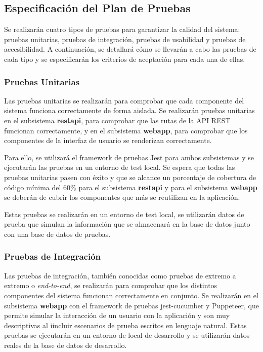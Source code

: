 \subsection{Especificación del Plan de Pruebas}
Se realizarán cuatro tipos de pruebas para garantizar la calidad del sistema: pruebas unitarias, pruebas de integración, pruebas de usabilidad y pruebas de accesibilidad.
A continuación, se detallará cómo se llevarán a cabo las pruebas de cada tipo y se especificarán los criterios de aceptación para cada una de ellas.

\subsubsection{Pruebas Unitarias}
Las pruebas unitarias se realizarán para comprobar que cada componente del sistema funciona correctamente de forma aislada.
Se realizarán pruebas unitarias en el subsistema \textbf{restapi}, para comprobar que las rutas de la API REST funcionan correctamente, y en el subsistema \textbf{webapp}, para comprobar que los componentes de la interfaz de usuario se renderizan correctamente.

Para ello, se utilizará el framework de pruebas Jest para ambos subsistemas y se ejecutarán las pruebas en un entorno de test local.
Se espera que todas las pruebas unitarias pasen con éxito y que se alcance un porcentaje de cobertura de código mínima del 60\% para el subsistema \textbf{restapi} 
y para el subsistema \textbf{webapp} se deberán de cubrir los componentes que más se reutilizan en la aplicación.


Estas pruebas se realizarán en un entorno de test local, se utilizarán datos de prueba que simulan la información que se almacenará en la base de datos junto con una base de datos de pruebas.


\subsubsection{Pruebas de Integración}
Las pruebas de integración, también conocidas como pruebas de extremo a extremo o \textit{end-to-end}, se realizarán para comprobar que los distintos componentes del sistema funcionan correctamente en conjunto.
Se realizarán en el subsistema \textbf{webapp} con el framework de pruebas jest-cucumber y Puppeteer, que permite simular la interacción de un usuario con la aplicación y son muy descriptivas al iincluir escenarios de prueba escritos en lenguaje natural.
Estas pruebas se ejecutarán en un entorno de local de desarrollo y se utilizarán datos reales de la base de datos de desarrollo.

